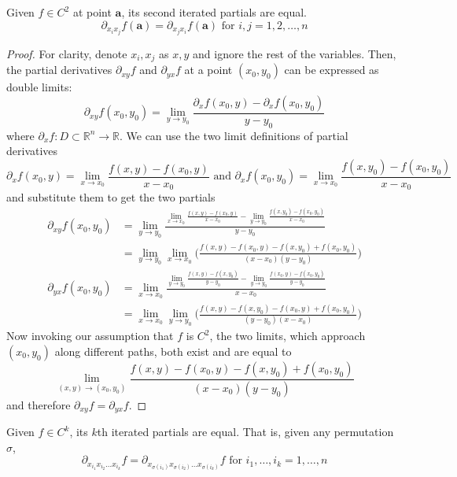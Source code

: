   \begin{theorem}
    Given $f \in C^2$ at point $\mathbf{a}$, its second iterated partials are equal. 
    \[\partial_{x_i x_j} f (\mathbf{a})= \partial_{x_j x_i} f (\mathbf{a})\text{ for } i, j = 1, 2, \ldots, n\]
  \end{theorem}
  \begin{proof}
    For clarity, denote $x_i, x_j$ as $x, y$ and ignore the rest of the variables. Then, the partial derivatives $\partial_{x y} f$ and $\partial_{y x} f$ at a point $(x_0, y_0)$ can be expressed as double limits: 
    \[\partial_{x y} f (x_0, y_0) = \lim_{y \rightarrow y_0} \frac{\partial_x f (x_0, y) - \partial_x f (x_0, y_0)}{y - y_0}\]
    where $\partial_x f: D \subset \mathbb{R}^n \longrightarrow \mathbb{R}$. We can use the two limit definitions of partial derivatives
    \[\partial_x f (x_0, y) = \lim_{x \rightarrow x_0} \frac{f(x, y) - f(x_0, y)}{x-x_0} \text{ and } \partial_x f (x_0, y_0) = \lim_{x \rightarrow x_0} \frac{f(x, y_0) - f(x_0, y_0)}{x-x_0}\]
    and substitute them to get the two partials
    \begin{align*}
        \partial_{xy} f (x_0, y_0) & = \lim_{y \rightarrow y_0} \frac{ \lim_{x \rightarrow x_0} \frac{f(x, y) - f(x_0, y)}{x-x_0} - \lim_{y \rightarrow y_0} \frac{f(x, y_0) - f(x_0, y_0)}{x-x_0}}{y - y_0} \\
        & =  \lim_{y \rightarrow y_0} \lim_{x \rightarrow x_0} \bigg( \frac{f(x, y) - f(x_0, y) - f(x, y_0) + f(x_0, y_0)}{(x - x_0) (y - y_0)} \bigg) \\
        \partial_{yx} f (x_0, y_0) & = \lim_{x \rightarrow x_0} \frac{ \lim_{y \rightarrow y_0} \frac{f(x, y) - f(x, y_0)}{y-y_0} - \lim_{y \rightarrow y_0} \frac{f(x_0, y) - f(x_0, y_0)}{y-y_0}}{x - x_0} \\
        & = \lim_{x \rightarrow x_0} \lim_{y \rightarrow y_0} \bigg( \frac{f(x, y) - f(x, y_0) - f(x_0, y) + f(x_0, y_0)}{(y-y_0) (x-x_0)} \bigg)
    \end{align*}
    Now invoking our assumption that $f$ is $C^2$, the two limits, which approach $(x_0, y_0)$ along different paths, both exist and are equal to 
    \[\lim_{(x, y) \rightarrow (x_0, y_0)} \frac{f(x, y) - f(x_0, y) - f(x, y_0) + f(x_0, y_0)}{(x - x_0) (y - y_0)}\]
    and therefore $\partial_{x y} f = \partial_{y x} f$. 
  \end{proof}

  \begin{corollary}
    Given $f \in C^k$, its $k$th iterated partials are equal. That is, given any permutation $\sigma$, 
    \[\partial_{x_{i_1} x_{i_2} \ldots x_{i_k}} f = \partial_{x_{\sigma(i_1)} x_{\sigma(i_2)} \ldots x_{\sigma(i_k)}} f \text{ for } i_1, \ldots, i_k = 1, \ldots, n\]
  \end{corollary}

